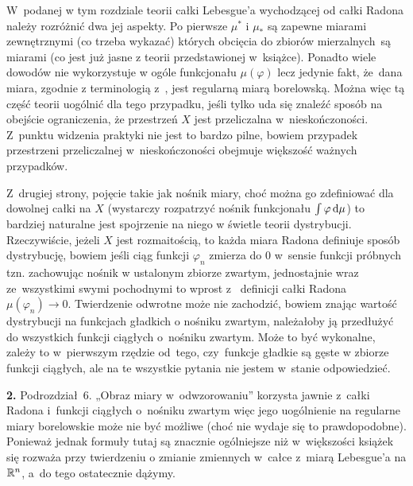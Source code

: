 \documentclass[a4paper,11pt]{article}
\begin{document}
\vspace{\spaceThree}

\start W~podanej w tym rozdziale teorii całki Lebesgue’a wychodzącej
od całki Radona należy rozróżnić dwa jej aspekty. Po pierwsze
$\mu^{ * }$ i $\mu_{ * }$ są zapewne miarami zewnętrznymi (co trzeba
wykazać) których obcięcia do zbiorów mierzalnych~są miarami (co jest
już jasne z teorii przedstawionej w~książce). Ponadto wiele dowodów
nie wykorzystuje w ogóle funkcjonału $\mu( \varphi )$ lecz jedynie
fakt, że~dana miara, zgodnie z terminologią
z~\cite{RudinAnalizaRzeczywistaIZespolona1998}, jest regularną miarą
borelowską. Można więc tą część teorii uogólnić dla tego przypadku,
jeśli tylko uda się znaleźć sposób na obejście ograniczenia, że
przestrzeń $X$ jest przeliczalna w~nieskończoności. Z~punktu widzenia
praktyki nie jest to bardzo pilne, bowiem przypadek przestrzeni
przeliczalnej w~nieskończoności obejmuje większość ważnych przypadków.

Z~drugiej strony, pojęcie takie jak nośnik miary, choć można go
zdefiniować dla dowolnej całki na $X$ (wystarczy rozpatrzyć nośnik
funkcjonału $\int \varphi \, \mathrm{d} \mu$) to bardziej naturalne jest
spojrzenie na niego w świetle teorii dystrybucji. Rzeczywiście, jeżeli
$X$ jest rozmaitością, to każda miara Radona definiuje sposób
dystrybucję, bowiem jeśli ciąg funkcji $\varphi_{ n }$ zmierza do 0
w~sensie funkcji próbnych tzn. zachowując nośnik w ustalonym zbiorze
zwartym, jednostajnie wraz ze~wszystkimi swymi pochodnymi to wprost z~
definicji całki Radona $\mu( \varphi_{ n } ) \to 0$. Twierdzenie
odwrotne może nie zachodzić, bowiem znając wartość dystrybucji na
funkcjach gładkich o nośniku zwartym, należałoby ją przedłużyć do
wszystkich funkcji ciągłych o~nośniku zwartym. Może to być wykonalne,
zależy to w~pierwszym rzędzie od~tego, czy~funkcje gładkie są gęste w
zbiorze funkcji ciągłych, ale na te wszystkie pytania nie jestem
w~stanie odpowiedzieć.

\vspace{\spaceFour}


\start \textbf{2.} Podrozdział~6. „Obraz miary w~odwzorowaniu”
korzysta jawnie z~całki Radona i~funkcji ciągłych o~nośniku zwartym
więc jego uogólnienie na regularne miary borelowskie może nie być
możliwe (choć nie wydaje się to prawdopodobne). Ponieważ jednak
formuły tutaj są znacznie ogólniejsze niż w~większości książek się
rozważa przy twierdzeniu o zmianie zmiennych w~całce z~miarą
Lebesgue’a na $\mathbb{R}^{ n }$, a~do tego ostatecznie dążymy.

\vspace{\spaceFour}
\end{document}
